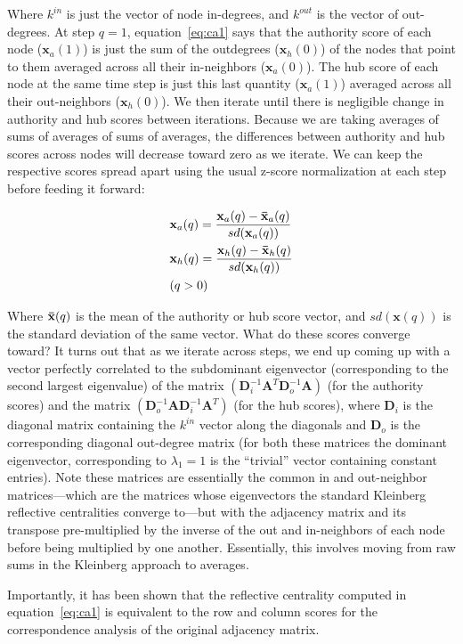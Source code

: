 \documentclass[a4paper,fleqn]{cas-sc}
\begin{document}
Where $k^{in}$ is just the vector of node in-degrees, and $k^{out}$ is the vector of out-degrees. At step $q = 1$, equation~\ref{eq:ca1} says that the authority score of each node ($\mathbf{x}_a(1)$) is just the sum of the outdegrees ($\mathbf{x}_h(0)$) of the nodes that point to them averaged across all their in-neighbors ($\mathbf{x}_a(0)$). The hub score of each node at the same time step is just this last quantity ($\mathbf{x}_a(1)$) averaged across all their out-neighbors ($\mathbf{x}_h(0)$). We then iterate until there is negligible change in authority and hub scores between iterations. Because we are taking averages of sums of averages of sums of averages, the differences between authority and hub scores across nodes will decrease toward zero as we iterate. We can keep the respective scores spread apart using the usual z-score normalization at each step before feeding it forward:

\begin{equation}
    \begin{split}
        &\mathbf{x}_a(q) = \frac{\mathbf{x}_a(q) - \mathbf{\Bar{x}}_a(q)}{sd(\mathbf{x}_a(q))} \\
        &\mathbf{x}_h(q) = \frac{\mathbf{x}_h(q) - \mathbf{\Bar{x}}_h(q)}{sd(\mathbf{x}_h(q))} \\ 
        & (q > 0) 
    \end{split}
    \label{eq:ca-norm}
\end{equation}

Where $\mathbf{\Bar{x}}(q)$ is the mean of the authority or hub score vector, and $sd(\mathbf{x}(q))$ is the standard deviation of the same vector. What do these scores converge toward? It turns out that as we iterate across steps, we end up coming up with a vector perfectly correlated to the subdominant eigenvector (corresponding to the second largest eigenvalue) of the matrix $(\mathbf{D}_{i}^{-1} \mathbf{A}^T \mathbf{D}_{o}^{-1} \mathbf{A})$ (for the authority scores) and the matrix $(\mathbf{D}_{o}^{-1} \mathbf{A} \mathbf{D}_{i}^{-1} \mathbf{A}^T)$ (for the hub scores), where $\mathbf{D}_{i}$ is the diagonal matrix containing the $k^{in}$ vector along the diagonals and $\mathbf{D}_{o}$ is the corresponding diagonal out-degree matrix (for both these matrices the dominant eigenvector, corresponding to $\lambda_1 = 1$ is the ``trivial'' vector containing constant entries). Note these matrices are essentially the common in and out-neighbor matrices---which are the matrices whose eigenvectors the standard Kleinberg reflective centralities converge to---but with the adjacency matrix and its transpose pre-multiplied by the inverse of the out and in-neighbors of each node before being multiplied by one another. Essentially, this involves moving from raw sums in the Kleinberg approach to averages.

Importantly, it has been shown that the reflective centrality computed in equation~\ref{eq:ca1} is equivalent to the row and column scores for the correspondence analysis of the original adjacency matrix. 


% 



\end{document}
